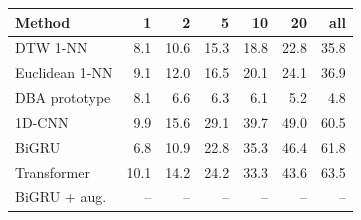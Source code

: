 \begin{tabular}{lrrrrrr}
\toprule
Method & 1 & 2 & 5 & 10 & 20 & all \\
\midrule
DTW 1-NN & 8.1 & 10.6 & 15.3 & 18.8 & 22.8 & 35.8 \\
Euclidean 1-NN & 9.1 & 12.0 & 16.5 & 20.1 & 24.1 & 36.9 \\
DBA prototype & 8.1 & 6.6 & 6.3 & 6.1 & 5.2 & 4.8 \\
1D-CNN & 9.9 & 15.6 & 29.1 & 39.7 & 49.0 & 60.5 \\
BiGRU & 6.8 & 10.9 & 22.8 & 35.3 & 46.4 & 61.8 \\
Transformer & 10.1 & 14.2 & 24.2 & 33.3 & 43.6 & 63.5 \\
BiGRU + aug. & -- & -- & -- & -- & -- & -- \\
\bottomrule
\end{tabular}
